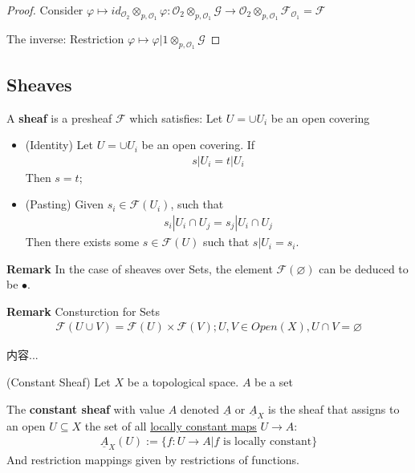 \documentclass[Total.tex]{subfiles}
\begin{document}
				\begin{proof}
					Consider $\varphi\mapsto id_{\mathcal{O}_2}\otimes_{p,\mathcal{O}_1} \varphi:\mathcal{O}_2\otimes_{p,\mathcal{O}_1} \mathcal{G}\rightarrow \mathcal{O}_2\otimes_{p,\mathcal{O}_1} \mathcal{F}_{\mathcal{O}_1}=\mathcal{F}$
					
					The inverse: Restriction $\varphi\mapsto \varphi|1\otimes_{p,\mathcal{O}_1} \mathcal{G}$
				\end{proof}
			
			\subsection{Sheaves}
				\begin{Def}
					A \textbf{sheaf} is a presheaf $\mathcal{F}$ which satisfies:  Let $U=\cup U_i$ be an open covering
					\begin{itemize}
						\item (Identity) Let $U=\cup U_i$ be an open covering. If 
						\begin{gather*}
							s|U_i=t|U_i
						\end{gather*}
						Then $s=t$;
						\item (Pasting) Given $s_i\in \mathcal{F}(U_i)$, such that
						\begin{gather*}
							s_i|U_i\cap U_j=s_j|U_i\cap U_j
						\end{gather*} 
						Then there exists some $s\in \mathcal{F}(U)$ such that $s|U_i=s_i$.
					\end{itemize}
				\end{Def}
				
				\textbf{Remark} In the case of sheaves over Sets, the element $\mathcal{F}(\varnothing)$ can be deduced to be $\bullet$. 
				
				\textbf{Remark} Consturction for Sets
				\begin{gather*}
					\mathcal{F}(U\cup V)=\mathcal{F}(U)\times \mathcal{F}(V);U,V\in Open(X),U\cap V=\varnothing
				\end{gather*}
				
				\begin{example}
					内容...
				\end{example}
				\begin{Def}
					(Constant Sheaf) Let $X$ be a topological space. $A$ be a set
					
					The \textbf{constant sheaf} with value $A$ denoted $\underline{A}$ or $\underline{A}_X$ is the sheaf that assigns to an open $U\subseteq X$ the set of all \underline{locally constant maps} $U\rightarrow A$:
					\begin{gather*}
						\underline{A}_X(U):=\{f:U\rightarrow A|f\mbox{ is locally constant}\}
					\end{gather*}
					And restriction mappings given by restrictions of functions.
				\end{Def}
				
\end{document}
